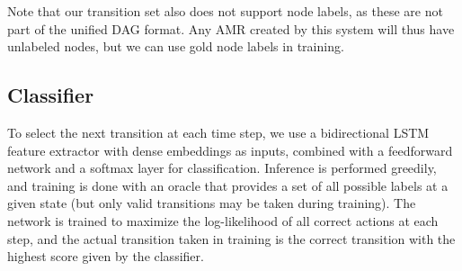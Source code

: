 \documentclass[11pt,a4paper]{article}
\begin{document}
Note that our transition set also does not support node labels, as these are not
part of the unified DAG format. Any AMR created by this system will thus have unlabeled
nodes, but we can use gold node labels in training.

\subsection{Classifier}\label{sec:classifier}
To select the next transition at each time step,
we use a bidirectional LSTM feature extractor with dense embeddings as inputs,
combined with a feedforward network and a softmax layer for classification.
Inference is performed greedily,
and training is done with an oracle that provides a set of all possible labels at a given state
(but only valid transitions may be taken during training).
The network is trained to maximize the log-likelihood of all correct actions at
each step, and the actual transition taken in training is the correct transition
with the highest score given by the classifier.
\end{document}
